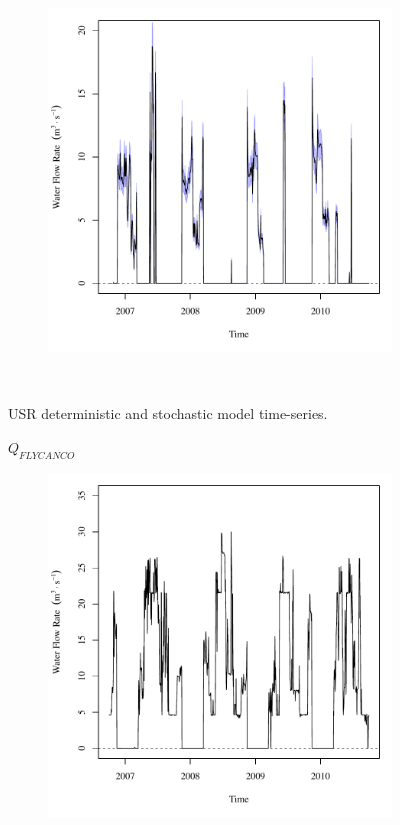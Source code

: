 \begin{linenumbers}
\begin{landscape}
\begin{figure}
\begin{subfigure}{0.7\textwidth}
			\includegraphics[width=\textwidth]{"Figures/Results_USR/Stochastic/Q FLS"}
		\end{subfigure}\\
		\caption{USR deterministic and stochastic model time-series.}
	\end{figure}
\end{landscape}
\subfiguremid
\begin{landscape}
	\begin{figure}
		\centering
		$ Q_{FLYCANCO} $
		\begin{subfigure}{0.7\textwidth}
			\centering
			\includegraphics[width=\textwidth]{"Figures/Results_USR/Deterministic/Q FLY"}

\end{subfigure}
\end{figure}
\end{landscape}
\end{linenumbers}
